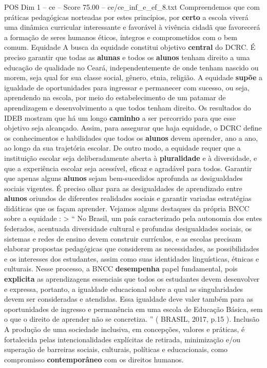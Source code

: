 \begin{textsample}{POS Dim 1 – ce – Score 75.00 – ce/ce\_inf\_e\_ef\_8.txt}
Compreendemos que com práticas pedagógicas norteadas por estes princípios, por \textbf{certo} a escola viverá uma dinâmica curricular interessante e favorável à vivência cidadã que favorecerá a formação de seres humanos éticos, íntegros e comprometidos com o bem comum.
Equidade A busca da equidade constitui objetivo \textbf{central} do DCRC.
É preciso garantir que todas as \textbf{alunas} e todos os \textbf{alunos} tenham direito a uma educação de qualidade no Ceará, independentemente de onde tenham nascido ou morem, seja qual for sua classe social, gênero, etnia, religião.
A equidade \textbf{supõe} a igualdade de oportunidades para ingressar e permanecer com sucesso, ou seja, aprendendo na escola, por meio do estabelecimento de um patamar de aprendizagem e desenvolvimento a que todos tenham direito.
Os resultados do IDEB mostram que há um longo \textbf{caminho} a ser percorrido para que esse objetivo seja alcançado.
Assim, para assegurar que haja equidade, o DCRC define os conhecimentos e habilidades que todos os \textbf{alunos} devem aprender, ano a ano, ao longo da sua trajetória escolar.
De outro modo, a equidade requer que a instituição escolar seja deliberadamente aberta à \textbf{pluralidade} e à diversidade, e que a experiência escolar seja acessível, eficaz e agradável para todos.
Garantir que apenas alguns \textbf{alunos} sejam bem-sucedidos aprofunda as desigualdades sociais vigentes.
É preciso olhar para as desigualdades de aprendizado entre \textbf{alunos} oriundos de diferentes realidades sociais e garantir variadas estratégias didáticas que os façam aprender.
Vejamos alguns destaques da própria BNCC sobre a equidade : > “ No Brasil, um país caracterizado pela autonomia dos entes federados, acentuada diversidade cultural e profundas desigualdades sociais, os sistemas e redes de ensino devem construir currículos, e as escolas precisam elaborar propostas pedagógicas que considerem as necessidades, as possibilidades e os interesses dos estudantes, assim como suas identidades linguísticas, étnicas e culturais.
Nesse processo, a BNCC \textbf{desempenha} papel fundamental, pois \textbf{explicita} as aprendizagens essenciais que todos os estudantes devem desenvolver e expressa, portanto, a igualdade educacional sobre a qual as singularidades devem ser consideradas e atendidas.
Essa igualdade deve valer também para as oportunidades de ingresso e permanência em uma escola de Educação Básica, sem o que o direito de aprender não se concretiza. ” ( BRASIL, 2017, p.15 ).
Inclusão A produção de uma sociedade inclusiva, em concepções, valores e práticas, é fortalecida pelas intencionalidades explícitas de retirada, minimização e/ou superação de barreiras sociais, culturais, políticas e educacionais, como compromisso \textbf{contemporâneo} com os direitos humanos.

\end{textsample}
